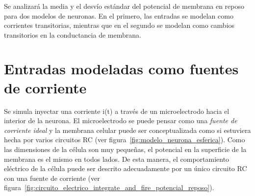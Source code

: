 Se analizará la media y el desvío estándar del potencial de membrana en reposo para dos modelos de neuronas. En el primero, las entradas se modelan como corrientes transitorias, mientras que en el segundo se modelan como cambios transitorios en la conductancia de membrana.
\section{Entradas modeladas como fuentes de corriente}
Se simula inyectar una corriente i(t) a través de un microelectrodo hacia el interior de la neurona.
El microelectrodo se puede pensar como una \textit{fuente de corriente ideal} y la membrana celular puede ser conceptualizada como si estuviera hecha por varios circuitos RC (ver figura~\ref{fig:modelo_neurona_esferica}). Como las dimensiones de la célula son muy pequeñas, el potencial en la superficie de la membrana es el mismo en todos lados. De esta manera, el comportamiento eléctrico de la célula puede ser descrito adecuadamente por un único circuito RC con una fuente de corriente (ver figura~\ref{fig:circuito_electrico_integrate_and_fire_potencial_reposo}).
